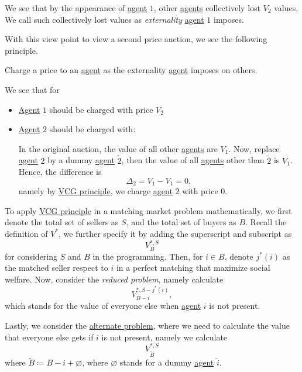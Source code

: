 We see that by the appearance of \hyperref[def:player]{agent} \(1\), other \hyperref[def:player]{agents} collectively lost \(V_{2}\) values.
We call such collectively lost values as \emph{externality} \hyperref[def:player]{agent} \(1\) imposes.

With this view point to view a second price auction, we see the following principle.
\begin{theorem}\label{thm:VCG}
	Charge a price to an \hyperref[def:player]{agent} as the externality \hyperref[def:player]{agent} imposes on others.
\end{theorem}
\begin{eg}
	We see that for
	\begin{itemize}
		\item \hyperref[def:player]{Agent} \(1\) should be charged with price \(V_2\)
		\item \hyperref[def:player]{Agent} \(2\) should be charged with:
		      \par In the original auction, the value of all other \hyperref[def:player]{agents} are \(V_{1}\). Now, replace \hyperref[def:player]{agent}
		      \(2\) by a dummy \hyperref[def:player]{agent} \(\tilde{2}\), then the value of all \hyperref[def:player]{agents} other
		      than \(\tilde{2}\) is \(V_{1}\). Hence, the difference is
		      \[
			      \Delta_{2} = V_{1} - V_{1} = 0,
		      \]
		      namely by \hyperref[thm:VCG]{VCG principle}, we charge \hyperref[def:player]{agent} \(2\) with price \(0\).
	\end{itemize}
\end{eg}

To apply \hyperref[thm:VCG]{VCG principle} in a matching market problem mathematically, we first denote the total set of sellers as \(S\), and the total
set of buyers as \(B\). Recall the definition of \(V^{\ast}\), we further specify it by adding the superscript and subscript as
\[
	V^{*, S}_{B}
\]
for considering \(S\) and \(B\) in the programming. Then, for \(i\in B\), denote \(j^{\ast} (i)\) as the matched seller respect to \(i\) in a perfect matching that
maximize social welfare. Now, consider the \emph{reduced problem}, namely calculate
\[
	V^{*, S-j^{\ast}(i)}_{B-i},
\]
which stands for the value of everyone else when \hyperref[def:player]{agent} \(i\) is not present.

Lastly, we consider the \underline{alternate problem}, where we need to calculate the value that everyone else gets if \(i\) is not present, namely we
calculate
\[
	V^{*, S}_{\widetilde{B}}
\]
where \(\widetilde{B} \coloneqq B - i + \varnothing \), where \(\varnothing \) stands for a dummy \hyperref[def:player]{agent} \(\widetilde{i} \).

